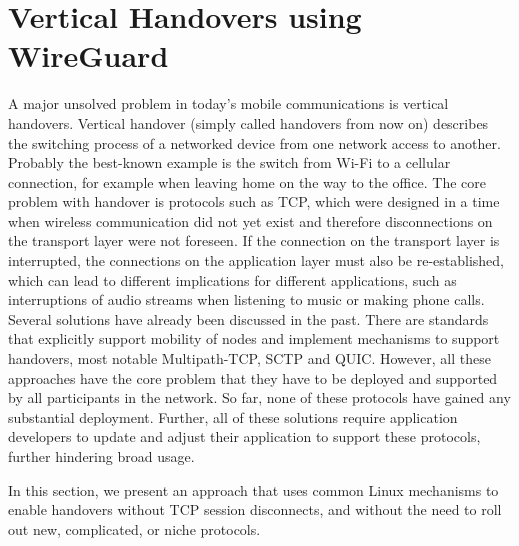 \newcommand{\ld}{\texttt{LD\_PRELOAD}\xspace}



\section{Vertical Handovers using WireGuard}
\label{sec:wg:impl}

A major unsolved problem in today's mobile communications is vertical handovers.
Vertical handover (simply called handovers from now on) describes the switching process of a networked device from one network access to another.
Probably the best-known example is the switch from Wi-Fi to a cellular connection, for example when leaving home on the way to the office.
The core problem with handover is protocols such as TCP, which were designed in a time when wireless communication did not yet exist and therefore disconnections on the transport layer were not foreseen.
If the connection on the transport layer is interrupted, the connections on the application layer must also be re-established, which can lead to different implications for different applications, such as interruptions of audio streams when listening to music or making phone calls.
Several solutions have already been discussed in the past.
There are standards that explicitly support mobility of nodes and implement mechanisms to support handovers, most notable Multipath-TCP, SCTP and QUIC.
However, all these approaches have the core problem that they have to be deployed and supported by all participants in the network.
So far, none of these protocols have gained any substantial deployment.
Further, all of these solutions require application developers to update and adjust their application to support these protocols, further hindering broad usage.

In this section, we present an approach that uses common Linux mechanisms to enable handovers without TCP session disconnects, and without the need to roll out new, complicated, or niche protocols.





